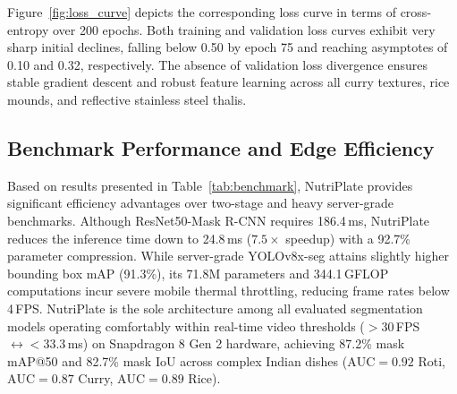 \documentclass[conference]{IEEEtran}
\begin{document}
Figure~\ref{fig:loss_curve} depicts the corresponding loss curve in terms of cross-entropy over 200 epochs. Both training and validation loss curves exhibit very sharp initial declines, falling below 0.50 by epoch 75 and reaching asymptotes of 0.10 and 0.32, respectively. The absence of validation loss divergence ensures stable gradient descent and robust feature learning across all curry textures, rice mounds, and reflective stainless steel thalis.

\subsection{Benchmark Performance and Edge Efficiency}
Based on results presented in Table~\ref{tab:benchmark}, NutriPlate provides significant efficiency advantages over two-stage and heavy server-grade benchmarks. Although ResNet50-Mask R-CNN requires 186.4\,ms, NutriPlate reduces the inference time down to 24.8\,ms ($7.5\times$ speedup) with a 92.7\% parameter compression. While server-grade YOLOv8x-seg attains slightly higher bounding box mAP (91.3\%), its 71.8M parameters and 344.1\,GFLOP computations incur severe mobile thermal throttling, reducing frame rates below 4\,FPS. NutriPlate is the sole architecture among all evaluated segmentation models operating comfortably within real-time video thresholds ($>30$\,FPS $\leftrightarrow < 33.3$\,ms) on Snapdragon 8 Gen 2 hardware, achieving 87.2\% mask mAP@50 and 82.7\% mask IoU across complex Indian dishes ($\text{AUC}=0.92$ Roti, $\text{AUC}=0.87$ Curry, $\text{AUC}=0.89$ Rice).
\end{document}
